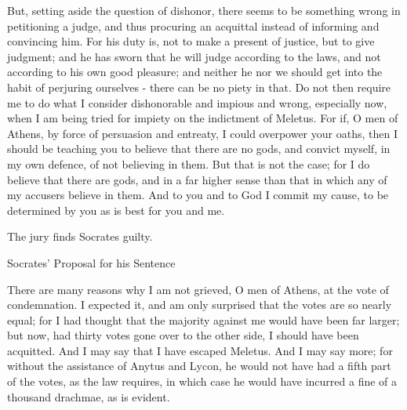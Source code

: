 \documentclass[11pt]{article}
\begin{document}
But, setting aside the question of dishonor, there seems to be something wrong in petitioning a judge, and thus procuring an acquittal instead of informing and convincing him. For his duty is, not to make a present of justice, but to give judgment; and he has sworn that he will judge according to the laws, and not according to his own good pleasure; and neither he nor we should get into the habit of perjuring ourselves - there can be no piety in that. Do not then require me to do what I consider dishonorable and impious and wrong, especially now, when I am being tried for impiety on the indictment of Meletus. For if, O men of Athens, by force of persuasion and entreaty, I could overpower your oaths, then I should be teaching you to believe that there are no gods, and convict myself, in my own defence, of not believing in them. But that is not the case; for I do believe that there are gods, and in a far higher sense than that in which any of my accusers believe in them. And to you and to God I commit my cause, to be determined by you as is best for you and me.


The jury finds Socrates guilty.

Socrates' Proposal for his Sentence

There are many reasons why I am not grieved, O men of Athens, at the vote of condemnation. I expected it, and am only surprised that the votes are so nearly equal; for I had thought that the majority against me would have been far larger; but now, had thirty votes gone over to the other side, I should have been acquitted. And I may say that I have escaped Meletus. And I may say more; for without the assistance of Anytus and Lycon, he would not have had a fifth part of the votes, as the law requires, in which case he would have incurred a fine of a thousand drachmae, as is evident.
\end{document}

